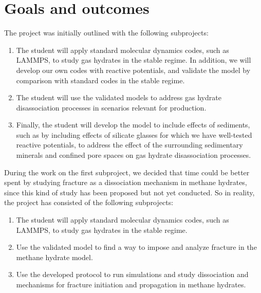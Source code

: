 \section{Goals and outcomes}
The project was initially outlined with the following subprojects:
\begin{enumerate}
\item {}
The student will apply standard molecular dynamics codes, such as LAMMPS,
to study gas hydrates in the stable regime. In addition, we will develop our
own codes with reactive potentials, and validate the model by comparison with
standard codes in the stable regime.
\item {}
The student will use the validated models to address gas hydrate disassociation
processes in scenarios relevant for production.
\item {}
Finally, the student will develop the model to include effects of sediments, such
as by including effects of silicate glasses for which we have well-tested reactive
potentials, to address the effect of the surrounding sedimentary minerals and
confined pore spaces on gas hydrate disassociation processes.
\end{enumerate}

During the work on the first subproject, we decided that time could be better spent by studying fracture as a dissociation mechanism in methane hydrates, since this kind of study has been proposed but not yet conducted. So in reality, the project has consisted of the following subprojects:

\begin{enumerate}
\item {}
The student will apply standard molecular dynamics codes, such as LAMMPS,
to study gas hydrates in the stable regime.
\item {}
Use the validated model to find a way to impose and analyze fracture in the methane hydrate model. 
\item {}
Use the developed protocol to run simulations and study dissociation and mechanisms for fracture initiation and propagation in methane hydrates.
\end{enumerate}

